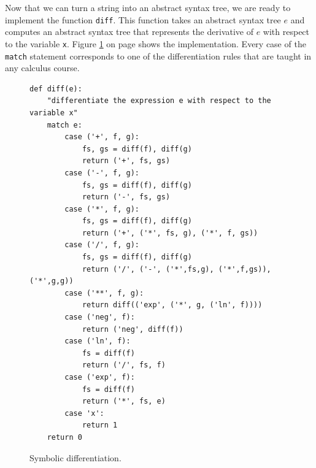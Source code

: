 \noindent
Now that we can turn a string into an abstract syntax tree, we are ready to implement the function
\texttt{diff}.  This function takes an abstract syntax tree $e$ and computes an abstract syntax tree that
represents the derivative of $e$ with respect to the variable \texttt{x}.  Figure
\ref{fig:02-Differentiator.ipynb:diff} on page \pageref{fig:02-Differentiator.ipynb:diff} shows the
implementation.  Every case of the \texttt{match} statement corresponds to one of the differentiation
rules that are taught in any calculus course.

\begin{figure}[!ht]
\centering
\begin{verbatim}
def diff(e):
    "differentiate the expression e with respect to the variable x"
    match e:
        case ('+', f, g):
            fs, gs = diff(f), diff(g)
            return ('+', fs, gs)
        case ('-', f, g):
            fs, gs = diff(f), diff(g)
            return ('-', fs, gs)
        case ('*', f, g):
            fs, gs = diff(f), diff(g)
            return ('+', ('*', fs, g), ('*', f, gs))
        case ('/', f, g):
            fs, gs = diff(f), diff(g)
            return ('/', ('-', ('*',fs,g), ('*',f,gs)), ('*',g,g))
        case ('**', f, g):
            return diff(('exp', ('*', g, ('ln', f))))
        case ('neg', f):
            return ('neg', diff(f))
        case ('ln', f):
            fs = diff(f)
            return ('/', fs, f)
        case ('exp', f):
            fs = diff(f)
            return ('*', fs, e)
        case 'x':
            return 1
    return 0
\end{verbatim}
\vspace*{-0.3cm}
\caption{Symbolic differentiation.}
\label{fig:02-Differentiator.ipynb:diff}
\end{figure}

